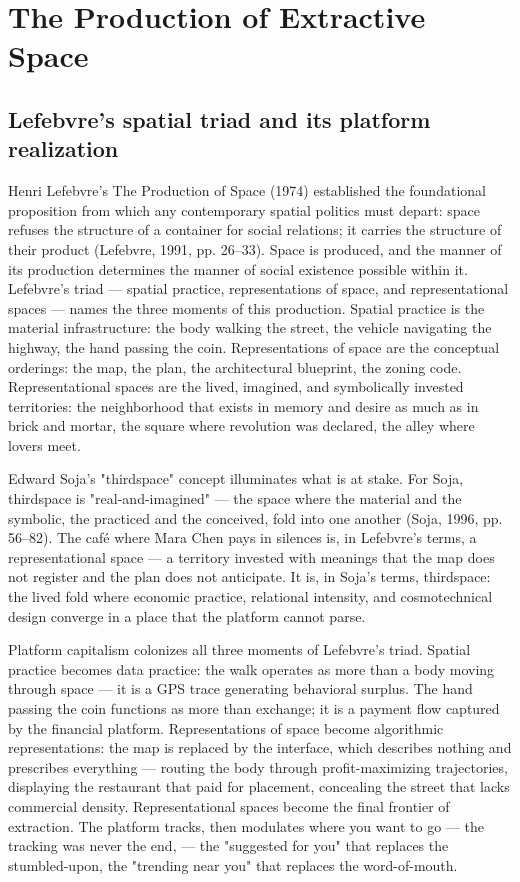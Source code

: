 \section{The Production of Extractive Space}

\subsection{Lefebvre's spatial triad and its platform realization}

Henri Lefebvre's The Production of Space (1974) established the foundational proposition from which any contemporary spatial politics must depart: space refuses the structure of a container for social relations; it carries the structure of their product (Lefebvre, 1991, pp. 26–33). Space is produced, and the manner of its production determines the manner of social existence possible within it. Lefebvre's triad — spatial practice, representations of space, and representational spaces — names the three moments of this production. Spatial practice is the material infrastructure: the body walking the street, the vehicle navigating the highway, the hand passing the coin. Representations of space are the conceptual orderings: the map, the plan, the architectural blueprint, the zoning code. Representational spaces are the lived, imagined, and symbolically invested territories: the neighborhood that exists in memory and desire as much as in brick and mortar, the square where revolution was declared, the alley where lovers meet.

Edward Soja's "thirdspace" concept illuminates what is at stake. For Soja, thirdspace is "real-and-imagined" — the space where the material and the symbolic, the practiced and the conceived, fold into one another (Soja, 1996, pp. 56–82). The café where Mara Chen pays in silences is, in Lefebvre's terms, a representational space — a territory invested with meanings that the map does not register and the plan does not anticipate. It is, in Soja's terms, thirdspace: the lived fold where economic practice, relational intensity, and cosmotechnical design converge in a place that the platform cannot parse.

Platform capitalism colonizes all three moments of Lefebvre's triad. Spatial practice becomes data practice: the walk operates as more than a body moving through space — it is a GPS trace generating behavioral surplus. The hand passing the coin functions as more than exchange; it is a payment flow captured by the financial platform. Representations of space become algorithmic representations: the map is replaced by the interface, which describes nothing and prescribes everything — routing the body through profit-maximizing trajectories, displaying the restaurant that paid for placement, concealing the street that lacks commercial density. Representational spaces become the final frontier of extraction. The platform tracks, then modulates where you want to go — the tracking was never the end, — the "suggested for you" that replaces the stumbled-upon, the "trending near you" that replaces the word-of-mouth.

